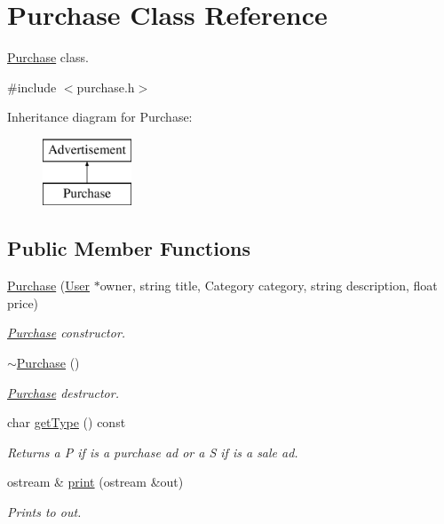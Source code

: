 \hypertarget{class_purchase}{}\section{Purchase Class Reference}
\label{class_purchase}


\hyperlink{class_purchase}{Purchase} class.  




{\ttfamily \#include $<$purchase.\+h$>$}

Inheritance diagram for Purchase\+:\begin{figure}[H]
\begin{center}
\leavevmode
\includegraphics[height=2.000000cm]{class_purchase}
\end{center}
\end{figure}
\subsection*{Public Member Functions}
\begin{DoxyCompactItemize}
\item 
\hyperlink{class_purchase_ab7f299a547a1762433273500bc4085cf}{Purchase} (\hyperlink{class_user}{User} $\ast$owner, string title, Category category, string description, float price)
\begin{DoxyCompactList}\small\item\em \hyperlink{class_purchase}{Purchase} constructor. \end{DoxyCompactList}\item 
\hypertarget{class_purchase_a8ebd6efb2177df6d10fcba514095915f}{}\hyperlink{class_purchase_a8ebd6efb2177df6d10fcba514095915f}{$\sim$\+Purchase} ()\label{class_purchase_a8ebd6efb2177df6d10fcba514095915f}

\begin{DoxyCompactList}\small\item\em \hyperlink{class_purchase}{Purchase} destructor. \end{DoxyCompactList}\item 
char \hyperlink{class_purchase_aacd849fc1ec2b96e7c59de4012b8e45a}{get\+Type} () const 
\begin{DoxyCompactList}\small\item\em Returns a P if is a purchase ad or a S if is a sale ad. \end{DoxyCompactList}\item 
ostream \& \hyperlink{class_purchase_ad9c91fe1eadbb43884d5e95fb9607b08}{print} (ostream \&out)
\begin{DoxyCompactList}\small\item\em Prints to out. \end{DoxyCompactList}\end{DoxyCompactItemize}
